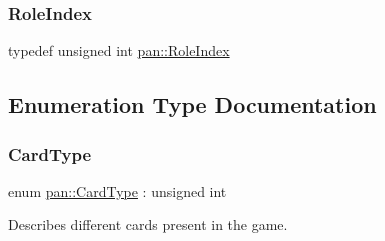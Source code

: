 \mbox{\label{namespacepan_ac258882dced8096a31086622ed4300fa}} 
\subsubsection{\texorpdfstring{Role\+Index}{RoleIndex}}
{\footnotesize\ttfamily typedef unsigned int \hyperlink{namespacepan_ac258882dced8096a31086622ed4300fa}{pan\+::\+Role\+Index}}



\subsection{Enumeration Type Documentation}
\mbox{\label{namespacepan_a1f7350bfd0421afeabe9fa95c16fa811}} 
\subsubsection{\texorpdfstring{Card\+Type}{CardType}}
{\footnotesize\ttfamily enum \hyperlink{namespacepan_a1f7350bfd0421afeabe9fa95c16fa811}{pan\+::\+Card\+Type} \+: unsigned int\hspace{0.3cm}{\ttfamily [strong]}}



Describes different cards present in the game. 

